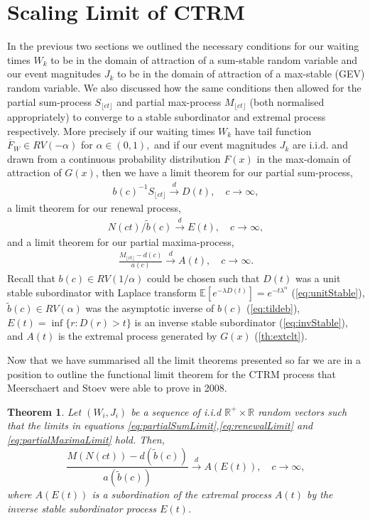 \documentclass[honours,12pt]{unswthesis}
\newcommand{\E}{\mathbb{E}}
\newcommand{\1}{\mathbf 1}
\newcommand{\Floor}[1]{{\lfloor {#1} \rfloor}}
\newcommand{\cd}{\overset{d}{\longrightarrow}}
\newtheorem{theorem}[equation]{Theorem}
\numberwithin{equation}{section}
\theoremstyle{definition}
\theoremstyle{remark}
\begin{document}
\section{Scaling Limit of CTRM}
In the previous two sections we outlined the necessary conditions for our waiting times $W_k$ to be in the domain of attraction of a sum-stable random variable and our event magnitudes $J_k$ to be in the domain of attraction of a max-stable (GEV) random variable. We also discussed how the same conditions then allowed for the partial sum-process $S_{\Floor{ct}}$ and partial max-process $M_{\Floor{ct}}$ (both normalised appropriately) to converge to a stable subordinator and extremal process respectively. More precisely if our waiting times $W_k$ have tail function $\overline F_W \in RV(-\alpha)$ for $\alpha\in(0,1),$ and if our event magnitudes $J_k$ are i.i.d. and drawn from a continuous probability distribution $F(x)$ in the max-domain of attraction of $G(x)$, then we have a limit theorem for our partial sum-process,
\begin{align}\label{eq:partialSumLimit}
	b(c)^{-1}S_\Floor{ct} \cd D(t), \quad c \to \infty,
\end{align}
a limit theorem for our renewal process,
\begin{align}\label{eq:renewalLimit}
	N(ct) / \tilde b(c) \cd E(t), \quad c \to \infty,
\end{align}
and a limit theorem for our partial maxima-process,
\begin{align}\label{eq:partialMaximaLimit}
	\frac{M_\Floor{ct}-d(c)}{a(c)} \cd A(t), \quad c \to \infty.
\end{align}
Recall that $b(c)\in RV(1/\alpha)$ could be chosen such that $D(t)$ was a unit stable subordinator with Laplace transform $\E[e^{-\lambda D(t)}] = e^{-t \lambda^\alpha}$ (\ref{eq:unitStable}), $\tilde b(c) \in RV(\alpha)$ was the asymptotic inverse of $b(c)$ (\ref{eq:tildeb}), $E(t) = \inf\{r: D(r) > t\}$ is an inverse stable subordinator (\ref{eq:invStable}), and $A(t)$ is the extremal process generated by $G(x)$ (\ref{th:extclt}).

Now that we have summarised all the limit theorems presented so far we are in a position to outline the functional limit theorem for the CTRM process that Meerschaert and Stoev were able to prove in 2008.

\begin{theorem}\label{th:AEt} \cite{MeerschaertStoev08}
Let $(W_i,J_i)$ be a sequence of i.i.d $\mathbb{R}^+\times\mathbb{R}$ random vectors such that the limits in equations \ref{eq:partialSumLimit},\ref{eq:renewalLimit} and \ref{eq:partialMaximaLimit} hold. Then,
        \[
            \frac{M(N(ct))-d(\tilde{b}(c))}{a(\tilde{b}(c))} \cd A(E(t)), \quad c\to\infty,
        \]
where $A(E(t))$ is a subordination of the extremal process $A(t)$ by the inverse stable subordinator process $E(t)$.\\
\end{theorem}
\end{document}
